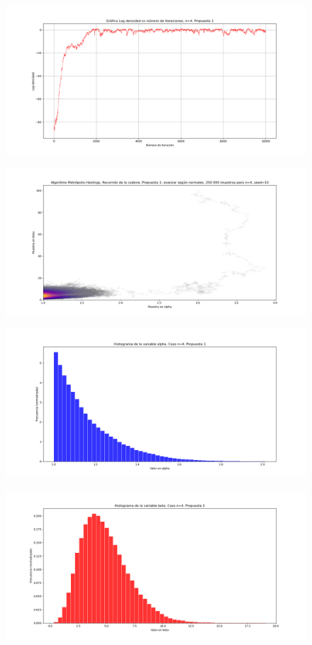 \documentclass[letterpaper]{article}
\newcommand{\1}{\mathds{1}}
\theoremstyle{definition}
\theoremstyle{definition}
\theoremstyle{definition}
\theoremstyle{definition}
\theoremstyle{definition}
\begin{document}
\begin{figure}[h!]
    \centering
    \includegraphics[width=\linewidth]{1.png}
    \caption{}
\end{figure} 
\begin{figure}[h!]
    \centering
    \includegraphics[width=\linewidth]{2.png}
    \caption{}
\end{figure} 
\begin{figure}[h!]
    \centering
    \includegraphics[width=\linewidth]{3.png}
    \caption{}
\end{figure} 
\begin{figure}[h!]
    \centering
    \includegraphics[width=\linewidth]{4.png}
    \caption{}
\end{figure} 
\end{document}
